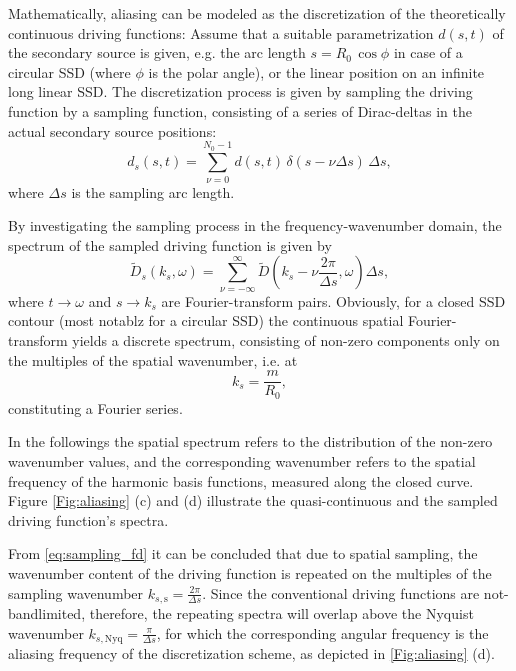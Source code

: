 \documentclass[conference]{IEEEtran}
\begin{document}
Mathematically, aliasing can be modeled as the discretization of the theoretically continuous driving functions:
Assume that a suitable parametrization $d(s,t)$ of the secondary source is given, e.g. the arc length $s = R_0\, \cos \phi$ in case of a circular SSD (where $\phi$ is the polar angle), or the linear position on an infinite long linear SSD.
The discretization process is given by sampling the driving function by a sampling function, consisting of a series of Dirac-deltas in the actual secondary source positions:
\begin{equation}
    d_s(s,t) = \sum_{\nu = 0}^{N_0-1} d(s,t) \, \delta(s - \nu \Delta s) \, \Delta s,
    \label{eq:sampling_td}
\end{equation}
where $\Delta s$ is the sampling arc length.

By investigating the sampling process in the frequency-wavenumber domain, the spectrum of the sampled driving function is given by
\begin{equation}
    \tilde{D}_s(k_s,\omega) = \sum_{\nu = -\infty}^{\infty} \tilde{D}\left(k_s- \nu \frac{2\pi}{\Delta s},\omega\right) \Delta s,
    \label{eq:sampling_fd}
\end{equation}
where $t \rightarrow \omega$ and $s \rightarrow k_s$ are Fourier-transform pairs.
Obviously, for a closed SSD contour (most notablz for a circular SSD) the continuous spatial Fourier-transform yields a discrete spectrum, consisting of non-zero components only on the multiples of the spatial wavenumber, i.e. at
\begin{equation}
    k_s = \frac{m}{R_0},
\end{equation}
constituting a Fourier series.

In the followings the spatial spectrum refers to the distribution of the non-zero wavenumber values, and the corresponding wavenumber refers to the spatial frequency of the harmonic basis functions, measured along the closed curve.
Figure \ref{Fig:aliasing} (c) and (d) illustrate the quasi-continuous and the sampled driving function's spectra.

From \eqref{eq:sampling_fd} it can be concluded that due to spatial sampling, the wavenumber content of the driving function is repeated on the multiples of the sampling wavenumber $k_{s, \mathrm{s}} = \frac{2\pi}{\Delta s}$.
Since the conventional driving functions are not-bandlimited, therefore, the repeating spectra will overlap above the Nyquist wavenumber $k_{s, \mathrm{Nyq}} = \frac{\pi}{\Delta s}$, for which the corresponding angular frequency is the aliasing frequency of the discretization scheme, as depicted in \ref{Fig:aliasing} (d).
\end{document}
